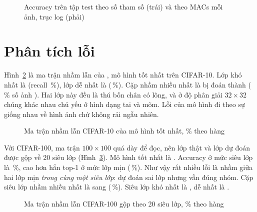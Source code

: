 \begin{figure}[H]
  \centering
  \caption{Accuracy trên tập test theo số tham số (trái) và theo MACs mỗi ảnh, trục log (phải)}
  \label{fig:scatter}
\end{figure}

\section{Phân tích lỗi}
\label{sec:loi}

Hình~\ref{fig:confc10} là ma trận nhầm lẫn của , mô hình tốt nhất trên CIFAR-10. Lớp
khó nhất là  (recall \,\%), lớp dễ nhất là
 (\,\%). Cặp nhầm nhiều nhất là
 bị đoán thành 
(\,\% số ảnh ). Hai lớp này đều là thú bốn chân
có lông, và ở độ phân giải $32\times32$ chúng khác nhau chủ yếu ở hình dạng tai và mõm. Lỗi của mô hình đi theo sự giống
nhau về hình ảnh chứ không rải ngẫu nhiên.

\begin{figure}[H]
  \centering
  \caption{Ma trận nhầm lẫn CIFAR-10 của mô hình tốt nhất, \% theo hàng}
  \label{fig:confc10}
\end{figure}

Với CIFAR-100, ma trận $100\times100$ quá dày để đọc, nên lớp thật và lớp dự đoán được gộp về 20 siêu lớp
(Hình~\ref{fig:confc100}). Mô hình tốt nhất là . Accuracy ở mức siêu lớp là
\,\%, cao hơn hẳn top-1 ở mức lớp mịn (\,\%). Như vậy
rất nhiều lỗi là nhầm giữa hai lớp mịn \emph{trong cùng một siêu lớp}: dự đoán sai lớp nhưng vẫn đúng nhóm. Cặp siêu lớp
nhầm nhiều nhất là  sang 
(\,\%). Siêu lớp khó nhất là , dễ nhất là
.

\begin{figure}[H]
  \centering
  \caption{Ma trận nhầm lẫn CIFAR-100 gộp theo 20 siêu lớp, \% theo hàng}
  \label{fig:confc100}
\end{figure}


